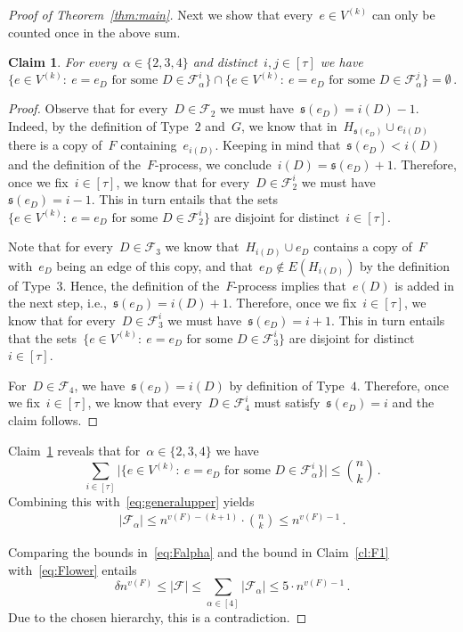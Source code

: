 \documentclass[10pt,a4paper]{amsart}
\newtheorem{claim}{Claim}
\newcommand{\cF}{\mathcal{F}}
\begin{document}
\begin{proof}[Proof of Theorem~\ref{thm:main}]
    Next we show that every~$e\in V^{(k)}$ can only be counted once in the above sum.
    \begin{claim}\label{cl:disjointsets}
        For every~$\alpha\in\{2,3,4\}$ and distinct~$i,j\in[\tau]$ we have $$\{e\in V^{(k)}:\:e=e_D\text{ for some }D\in\cF_{\alpha}^i\}\cap\{e\in V^{(k)}:\:e=e_D\text{ for some }D\in\cF_{\alpha}^j\}=\emptyset\,.$$
    \end{claim}

    \begin{proof}
        Observe that for every~$D\in\cF_2$ we must have~$\mathfrak{s}(e_D)=i(D)-1$.
        Indeed, by the definition of Type~$2$ and~$G$, we know that in~$H_{\mathfrak{s}(e_D)}\cup e_{i(D)}$ there is a copy of~$F$ containing~$e_{i(D)}$.
        Keeping in mind that~$\mathfrak{s}(e_D)<i(D)$ and the definition of the~$F$-process, we conclude~$i(D)=\mathfrak{s}(e_D)+1$.
        Therefore, once we fix~$i\in[\tau]$, we know that for every~$D\in\cF_2^i$ we must have~$\mathfrak{s}(e_D)=i-1$.
        This in turn entails that the sets~$\{e\in V^{(k)}:\:e=e_D\text{ for some }D\in\cF_2^i\}$ are disjoint for distinct~$i\in[\tau]$.
        
        Note that for every~$D\in\cF_3$ we know that~$H_{i(D)}\cup e_D$ contains a copy of~$F$ with~$e_D$ being an edge of this copy, and that~$e_D\notin E(H_{i(D)})$ by the definition of Type~$3$.
        Hence, the definition of the~$F$-process implies that~$e(D)$ is added in the next step, i.e.,~$\mathfrak{s}(e_D)=i(D)+1$.
        Therefore, once we fix~$i\in[\tau]$, we know that for every~$D\in\cF_3^i$ we must have~$\mathfrak{s}(e_D)=i+1$.
        This in turn entails that the sets~$\{e\in V^{(k)}:\:e=e_D\text{ for some }D\in\cF_3^i\}$ are disjoint for distinct~$i\in[\tau]$.
        
        For~$D\in\cF_4$, we have~$\mathfrak{s}(e_D)=i(D)$ by definition of Type~$4$.
        Therefore, once we fix~$i\in[\tau]$, we know that every~$D\in\cF_4^i$ must satisfy~$\mathfrak{s}(e_D)=i$ and the claim follows.
    \end{proof}

    Claim~\ref{cl:disjointsets} reveals that for~$\alpha\in\{2,3,4\}$ we have $$\sum_{i \in [\tau]}\big\vert\{e\in V^{(k)}:\:e=e_D\text{ for some }D\in\cF_{\alpha}^i\}\big\vert\leq\binom{n}{k}\,.$$
    Combining this with~\eqref{eq:generalupper} yields
    \begin{align}\label{eq:Falpha}
        \vert\cF_{\alpha}\vert\leq n^{v(F)-(k+1)}\cdot\binom{n}{k}\leq n^{v(F)-1}\,.
    \end{align}

    Comparing the bounds in~\eqref{eq:Falpha} and the bound in Claim~\ref{cl:F1} with~\eqref{eq:Flower} entails
    $$\delta n^{v(F)}\leq\vert\cF\vert\leq\sum_{\alpha\in[4]}\vert\cF_{\alpha}\vert\leq 5\cdot n^{v(F)-1}\,.$$
    Due to the chosen hierarchy, this is a contradiction.
    \end{proof}
\end{document}
